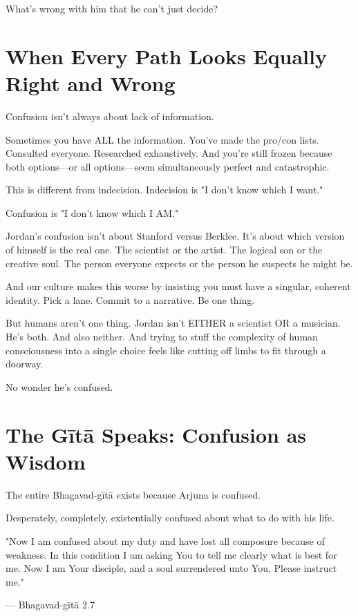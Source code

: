 \documentclass[11pt,twoside]{book}
\begin{document}
What's wrong with him that he can't just decide?

\section*{When Every Path Looks Equally Right and Wrong}

Confusion isn't always about lack of information.

Sometimes you have ALL the information. You've made the pro/con lists. Consulted everyone. Researched exhaustively. And you're still frozen because both options—or all options—seem simultaneously perfect and catastrophic.

This is different from indecision. Indecision is "I don't know which I want."

Confusion is "I don't know which I AM."

Jordan's confusion isn't about Stanford versus Berklee. It's about which version of himself is the real one. The scientist or the artist. The logical son or the creative soul. The person everyone expects or the person he suspects he might be.

And our culture makes this worse by insisting you must have a singular, coherent identity. Pick a lane. Commit to a narrative. Be one thing.

But humans aren't one thing. Jordan isn't EITHER a scientist OR a musician. He's both. And also neither. And trying to stuff the complexity of human consciousness into a single choice feels like cutting off limbs to fit through a doorway.

No wonder he's confused.

\section*{The Gītā Speaks: Confusion as Wisdom}

The entire Bhagavad-gītā exists because Arjuna is confused.

Desperately, completely, existentially confused about what to do with his life.

\begin{pullquote}
"Now I am confused about my duty and have lost all composure because of weakness. In this condition I am asking You to tell me clearly what is best for me. Now I am Your disciple, and a soul surrendered unto You. Please instruct me."

--- Bhagavad-gītā 2.7
\end{pullquote}
\end{document}
